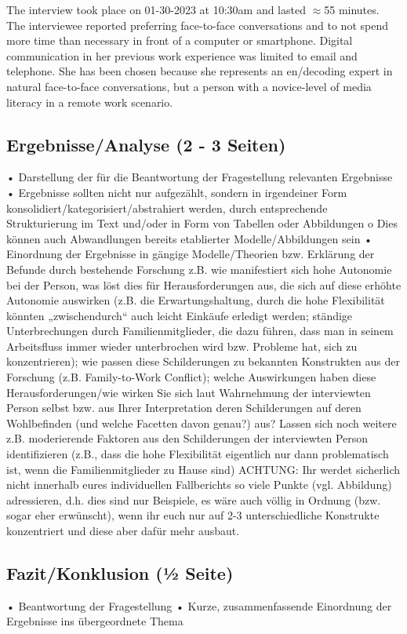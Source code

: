 \documentclass[man]{apa7}
\begin{document}
The interview took place on 01-30-2023 at 10:30am and lasted $\approx$55 minutes. The interviewee reported preferring face-to-face conversations and to not spend more time than necessary in front of a computer or smartphone. Digital communication in her previous work experience was limited to email and telephone. She has been chosen because she represents an en/decoding expert in natural face-to-face conversations, but a person with a novice-level of media literacy in a remote work scenario. 

\subsection{Ergebnisse/Analyse (2 - 3 Seiten)}
• Darstellung der für die Beantwortung der Fragestellung relevanten Ergebnisse
• Ergebnisse sollten nicht nur aufgezählt, sondern in irgendeiner Form
konsolidiert/kategorisiert/abstrahiert werden, durch entsprechende Strukturierung im Text und/oder in Form von Tabellen oder Abbildungen
o Dies können auch Abwandlungen bereits etablierter Modelle/Abbildungen sein
• Einordnung der Ergebnisse in gängige Modelle/Theorien bzw. Erklärung der Befunde durch
bestehende Forschung
z.B. wie manifestiert sich hohe Autonomie bei der Person, was löst dies für Herausforderungen aus, die sich auf diese erhöhte Autonomie auswirken (z.B. die Erwartungshaltung, durch die hohe Flexibilität könnten „zwischendurch“ auch leicht Einkäufe erledigt werden; ständige Unterbrechungen durch Familienmitglieder, die dazu führen, dass man in seinem Arbeitsfluss immer wieder unterbrochen wird bzw. Probleme hat, sich zu konzentrieren); wie passen diese Schilderungen zu bekannten Konstrukten aus der Forschung (z.B. Family-to-Work Conflict); welche Auswirkungen haben diese Herausforderungen/wie wirken Sie sich laut Wahrnehmung der interviewten Person selbst bzw. aus Ihrer Interpretation deren Schilderungen auf deren Wohlbefinden (und welche Facetten davon genau?) aus? Lassen sich noch weitere z.B. moderierende Faktoren aus den Schilderungen der interviewten Person identifizieren (z.B., dass die hohe Flexibilität eigentlich nur dann problematisch ist, wenn die Familienmitglieder zu Hause sind)
ACHTUNG: Ihr werdet sicherlich nicht innerhalb eures individuellen Fallberichts so viele Punkte (vgl. Abbildung) adressieren, d.h. dies sind nur Beispiele, es wäre auch völlig in Ordnung (bzw. sogar eher erwünscht), wenn ihr euch nur auf 2-3 unterschiedliche Konstrukte konzentriert und diese aber dafür mehr ausbaut.

\subsection{Fazit/Konklusion (1⁄2 Seite)}
• Beantwortung der Fragestellung
• Kurze, zusammenfassende Einordnung der Ergebnisse ins übergeordnete Thema

\printbibliography

\appendix
\end{document}
